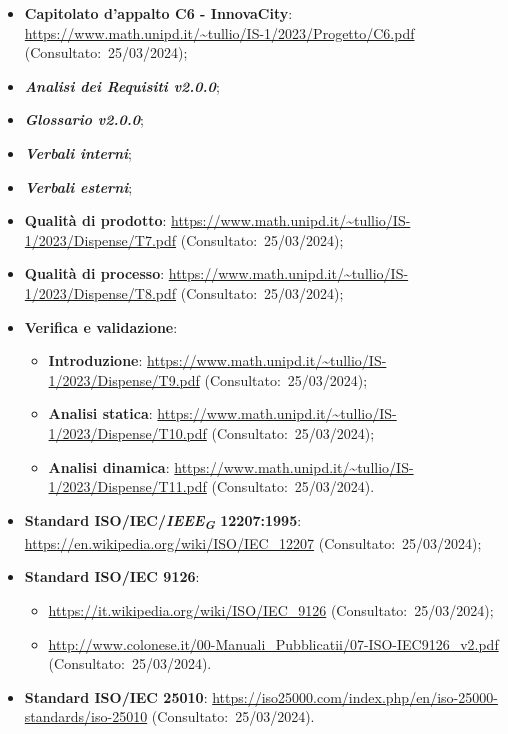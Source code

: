 \begin{itemize}
    \item \textbf{Capitolato d’appalto C6 - InnovaCity}: \url{https://www.math.unipd.it/~tullio/IS-1/2023/Progetto/C6.pdf} (Consultato:~25/03/2024);
    \item \textbf{\textit{Analisi dei Requisiti v2.0.0}};
    \item \textbf{\textit{Glossario v2.0.0}};
    \item \textbf{\textit{Verbali interni}};
    \item \textbf{\textit{Verbali esterni}};
    \item \textbf{Qualità di prodotto}: \url{https://www.math.unipd.it/~tullio/IS-1/2023/Dispense/T7.pdf} (Consultato:~25/03/2024);
    \item \textbf{Qualità di processo}: \url{https://www.math.unipd.it/~tullio/IS-1/2023/Dispense/T8.pdf} (Consultato:~25/03/2024);
    \item \textbf{Verifica e validazione}: \begin{itemize}
    \item \textbf{Introduzione}: \url{https://www.math.unipd.it/~tullio/IS-1/2023/Dispense/T9.pdf} (Consultato:~25/03/2024);
    \item \textbf{Analisi statica}: \url{https://www.math.unipd.it/~tullio/IS-1/2023/Dispense/T10.pdf} (Consultato:~25/03/2024);
    \item \textbf{Analisi dinamica}: \url{https://www.math.unipd.it/~tullio/IS-1/2023/Dispense/T11.pdf} (Consultato:~25/03/2024).
    \end{itemize}
    \item \textbf{Standard ISO/IEC/\textit{IEEE}\textsubscript{\textit{G}} 12207:1995}: \url{https://en.wikipedia.org/wiki/ISO/IEC_12207} (Consultato:~25/03/2024);
    \item \textbf{Standard ISO/IEC 9126}:
    \begin{itemize}
        \item \url{https://it.wikipedia.org/wiki/ISO/IEC_9126} (Consultato:~25/03/2024);
        \item \url{http://www.colonese.it/00-Manuali_Pubblicatii/07-ISO-IEC9126_v2.pdf} (Consultato:~25/03/2024).
    \end{itemize}
    \item \textbf{Standard ISO/IEC 25010}: \url{https://iso25000.com/index.php/en/iso-25000-standards/iso-25010} (Consultato:~25/03/2024).
\end{itemize}
